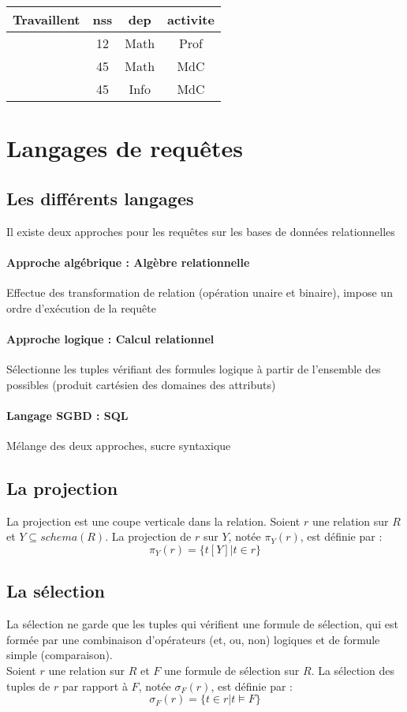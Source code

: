 \documentclass[10pt,a4paper]{article}
\begin{document}
\medskip

\begin{tabular}{c|ccc}
Travaillent & nss & dep & activite \\ 
\hline 
 & 12 & Math & Prof\\ 
 & 45 & Math & MdC\\
 & 45 & Info & MdC\\ 
\end{tabular} 

\section{Langages de requêtes}
\subsection{Les différents langages}

Il existe deux approches pour les requêtes sur les bases de données relationnelles

\paragraph*{Approche algébrique : Algèbre relationnelle}
Effectue des transformation de relation (opération unaire et binaire), impose un ordre d'exécution de la requête

\paragraph*{Approche logique : Calcul relationnel}
Sélectionne les tuples vérifiant des formules logique à partir de l'ensemble des possibles (produit cartésien des domaines des attributs)

\paragraph*{Langage SGBD : SQL}
Mélange des deux approches, sucre syntaxique

\subsection{La projection}
La projection est une coupe verticale dans la relation. Soient $r$ une relation sur $R$ et $Y \subseteq schema(R)$.
La projection de $r$ sur $Y$, notée $\pi_{Y}(r)$, est définie par : 
$$ \pi_{Y}(r)  = \{ t[Y] | t\in r \}$$

\subsection{La sélection}
La sélection ne garde que les tuples qui vérifient une formule de sélection, qui est formée par une combinaison d'opérateurs (et, ou, non) logiques et de formule simple (comparaison).\\
Soient $r$ une relation sur $R$ et $F$ une formule de sélection sur $R$. La sélection des tuples de $r$ par rapport à $F$, notée $\sigma_{F}(r)$, est définie par :
$$ \sigma_{F}(r) = \{t \in r | t \models F\} $$
\end{document}

